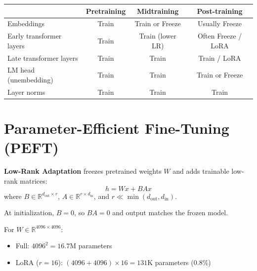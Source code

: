 \begin{remark}
    \begin{center}
        \begin{tabular}{l|ccc}
                                     & \textbf{Pretraining} & \textbf{Midtraining} & \textbf{Post-training} \\
            \hline
            Embeddings               & Train                & Train or Freeze      & Usually Freeze         \\
            Early transformer layers & Train                & Train (lower LR)     & Often Freeze / LoRA    \\
            Late transformer layers  & Train                & Train                & Train / LoRA           \\
            LM head (unembedding)    & Train                & Train                & Train or Freeze        \\
            Layer norms              & Train                & Train                & Train                  \\
        \end{tabular}
    \end{center}
\end{remark}

\section{Parameter-Efficient Fine-Tuning (PEFT)}

\begin{definition}[LoRA]
    \textbf{Low-Rank Adaptation} freezes pretrained weights $W$ and adds trainable low-rank matrices:
    \[
        h = Wx + BAx
    \]
    where $B \in \mathbb{R}^{d_{\text{out}} \times r}$, $A \in \mathbb{R}^{r \times d_{\text{in}}}$, and $r \ll \min(d_{\text{out}}, d_{\text{in}})$.

    At initialization, $B = 0$, so $BA = 0$ and output matches the frozen model.
\end{definition}

\begin{example}
    For $W \in \mathbb{R}^{4096 \times 4096}$:
    \begin{itemize}
        \item Full: $4096^2 = 16.7$M parameters
        \item LoRA ($r=16$): $(4096 + 4096) \times 16 = 131$K parameters (0.8\%)
    \end{itemize}
\end{example}

